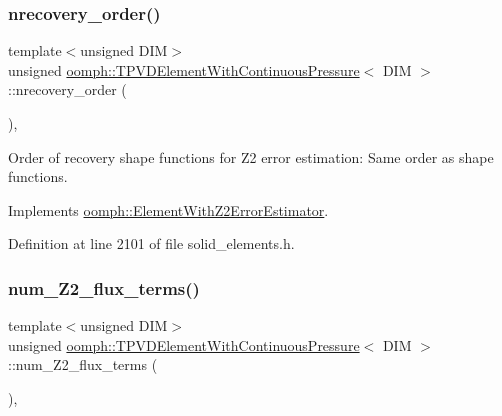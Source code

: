 \subsubsection{\texorpdfstring{nrecovery\+\_\+order()}{nrecovery\_order()}}
{\footnotesize\ttfamily template$<$unsigned D\+IM$>$ \\
unsigned \hyperlink{classoomph_1_1TPVDElementWithContinuousPressure}{oomph\+::\+T\+P\+V\+D\+Element\+With\+Continuous\+Pressure}$<$ D\+IM $>$\+::nrecovery\+\_\+order (\begin{DoxyParamCaption}{ }\end{DoxyParamCaption})\hspace{0.3cm}{\ttfamily [inline]}, {\ttfamily [virtual]}}



Order of recovery shape functions for Z2 error estimation\+: Same order as shape functions. 



Implements \hyperlink{classoomph_1_1ElementWithZ2ErrorEstimator_af39480835bd3e0f6b2f4f7a9a4044798}{oomph\+::\+Element\+With\+Z2\+Error\+Estimator}.



Definition at line 2101 of file solid\+\_\+elements.\+h.

\mbox{\label{classoomph_1_1TPVDElementWithContinuousPressure_a58c787ae0839874b13611b75c37863f7}} 
\subsubsection{\texorpdfstring{num\+\_\+\+Z2\+\_\+flux\+\_\+terms()}{num\_Z2\_flux\_terms()}}
{\footnotesize\ttfamily template$<$unsigned D\+IM$>$ \\
unsigned \hyperlink{classoomph_1_1TPVDElementWithContinuousPressure}{oomph\+::\+T\+P\+V\+D\+Element\+With\+Continuous\+Pressure}$<$ D\+IM $>$\+::num\+\_\+\+Z2\+\_\+flux\+\_\+terms (\begin{DoxyParamCaption}{ }\end{DoxyParamCaption})\hspace{0.3cm}{\ttfamily [inline]}, {\ttfamily [virtual]}}



